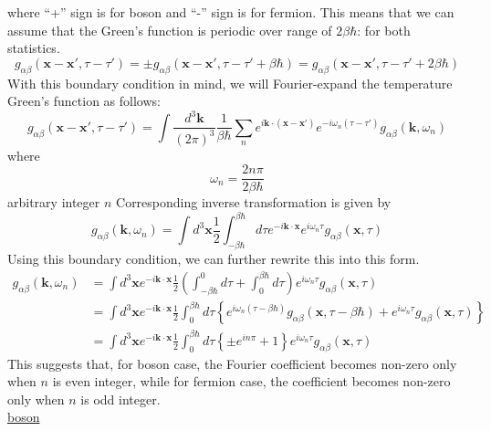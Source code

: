 where ``+'' sign is for boson and ``-'' sign is for fermion.
This means that we can assume that the Green's function is periodic over range of $2\beta\hbar$: for both statistics.
\begin{equation}
g_{\alpha\beta}(\mathbf{x}-\mathbf{x}',\tau-\tau')=\pm g_{\alpha\beta}(\mathbf{x}-\mathbf{x}',\tau-\tau'+\beta\hbar)= g_{\alpha\beta}(\mathbf{x}-\mathbf{x}',\tau-\tau'+2\beta\hbar)
\end{equation}
With this boundary condition in mind, we will Fourier-expand the temperature Green's function as follows:
\begin{equation}
g_{\alpha\beta}(\mathbf{x}-\mathbf{x}',\tau-\tau')=\int\frac{d^3 \mathbf{k}}{(2\pi)^3} \frac{1}{\beta\hbar}\sum_n e^{i\mathbf{k}\cdot(\mathbf{x}-\mathbf{x}')} e^{-i\omega_n(\tau-\tau')} g_{\alpha\beta}(\mathbf{k},\omega_n)
\end{equation}
where
\begin{equation}
\omega_n =\frac{2n\pi}{2\beta\hbar}
\end{equation}
arbitrary integer $n$
Corresponding inverse transformation is given by
\begin{equation}
g_{\alpha\beta}(\mathbf{k},\omega_n)=\int d^3\mathbf{x}\frac{1}{2} \int_{-\beta\hbar}^{\beta\hbar} d\tau e^{-i\mathbf{k}\cdot\mathbf{x}} e^{i\omega_n\tau} g_{\alpha\beta} (\mathbf{x},\tau)
\end{equation}
Using this boundary condition, we can further rewrite this into this form.
\[
\begin{aligned}
g_{\alpha\beta}(\mathbf{k},\omega_n)&=\int d^3\mathbf{x} e^{-i\mathbf{k}\cdot\mathbf{x}} \frac{1}{2} \left(\int_{-\beta\hbar}^0 d\tau+\int_0^{\beta\hbar} d\tau\right) e^{i\omega_n\tau} g_{\alpha\beta}(\mathbf{x},\tau)\\
&=\int d^3 \mathbf{x} e^{-i\mathbf{k}\cdot\mathbf{x}} \frac{1}{2} \int_0^{\beta\hbar} d\tau \left\{e^{i\omega_n(\tau-\beta\hbar)}g_{\alpha\beta}(\mathbf{x},\tau-\beta\hbar)+e^{i\omega_n\tau}g_{\alpha\beta}(\mathbf{x},\tau)\right\}\\
&=\int d^3\mathbf{x} e^{-i\mathbf{k}\cdot\mathbf{x}}\frac{1}{2} \int_0^{\beta\hbar} d\tau \left\{\pm e^{in\pi}+1\right\}e^{i\omega_n\tau}g_{\alpha\beta}(\mathbf{x},\tau)
\end{aligned} \tag{$4.4.12^\prime$}
\]
This suggests that, for boson case, the Fourier coefficient becomes non-zero only when $n$ is even integer, while for fermion case, the coefficient becomes non-zero only when $n$ is odd integer.\\
\uline{boson}
